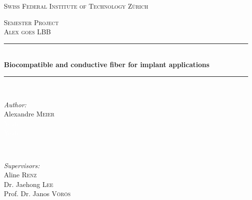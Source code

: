 \begin{titlepage}

\newcommand{\HRule}{\rule{\linewidth}{0.5mm}} %

\center %
 
{\textsc{\LARGE Swiss Federal Institute of Technology Zürich  }\\[1cm]
}

\textsc{\Large Semester Project}\\[0.5cm] %
\textsc{\large Alex goes LBB}\\[0.5cm] %


\HRule \\[0.4cm]
{  {\huge \bfseries Biocompatible and conductive fiber for implant applications}}\\[0.4cm] %

\HRule \\[1.5cm]
 

\begin{minipage}{0.4\textwidth}
\begin{flushleft} \large
\emph{Author:}\\
Alexandre \textsc{Meier}\\
\textcolor{white}{Yeah}\\
\textcolor{white}{Yeah}
\end{flushleft}
\end{minipage}
~
\begin{minipage}{0.5\textwidth}
\begin{flushright} \large
\emph{Supervisors:} \\
Aline \textsc{Renz}\\
Dr. Jaehong \textsc{Lee}\\
Prof. Dr. Janos \textsc{Vörös}
\end{flushright}
\end{minipage}\\[2cm]



\end{titlepage}
